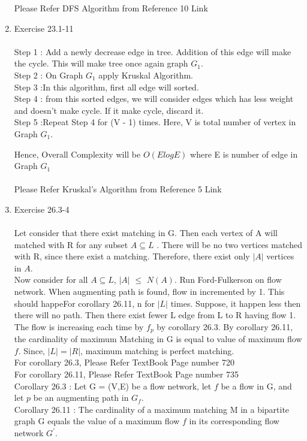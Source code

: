 \documentclass{article}
\begin{document}
\begin{enumerate}
    Please Refer DFS Algorithm from Reference 10 Link \\
    \item Exercise 23.1-11\\ \\
    Step 1 : Add a newly decrease edge in tree. Addition of this edge will make the cycle. This will make tree once again graph $G_{1}$.\\
    Step 2 : On  Graph $G_{1}$ apply Kruskal Algorithm.\\
    Step 3 :In this algorithm, first all edge will sorted.\\
    Step 4 : from this sorted edges, we will consider edges which has less weight and doesn't make cycle. If it make cycle, discard it. \\
    Step 5 :Repeat Step 4 for (V - 1) times. Here, V is total number of vertex in Graph $G_{1}$.
    
    Hence, Overall Complexity will  be $O(ElogE)$ where E  is number of edge  in Graph 
    $G_{1}$ \\\\
    Please Refer Kruskal's  Algorithm from Reference 5 Link \\

    \item Exercise 26.3-4\\ \\
    Let consider that there exist matching in G. Then each vertex of A will matched with R for any subset  $A \subseteq L$  . There will be no two vertices matched with R, since there exist a matching. Therefore, there exist only $|A|$ vertices in $A$.\\
    
    Now consider for all $A \subseteq L$,  $|A|$ $\leq$ $N(A)$. Run Ford-Fulkerson on flow network. When augmenting path is found, flow in incremented by 1. This should happeFor corollary 26.11,
n for $|L|$ times. Suppose, it happen less then there will no path. Then there exist fewer  L edge from L to R having flow 1.  \\
    
    The flow is increasing each time by $f_{p}$ by corollary 26.3.   By corollary 26.11, the cardinality of maximum Matching in G is equal to value of  maximum flow $f$. Since, $|L| = |R|$, maximum matching is perfect matching.\\
    
    For corollary 26.3, Please Refer TextBook Page number 720\\
    For corollary 26.11, Please Refer TextBook Page number 735 \\

    Corollary 26.3 :  Let G = (V,E) be a flow network, let $f$ be a flow in G, and let $p$ be an augmenting path in $G_{f}$. \\
    Corollary 26.11 : The cardinality of a maximum matching M in a bipartite graph G equals the value of a maximum flow $f$ in its corresponding flow network $G^{'}$.
\end{enumerate}
\end{document}
